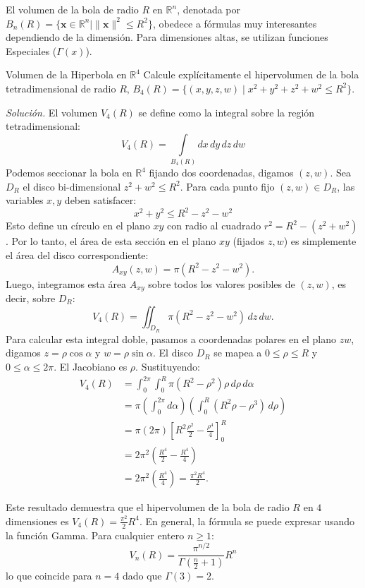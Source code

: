 \documentclass[11pt,a4paper]{article}
\begin{document}
El volumen de la bola de radio $R$ en $\mathbb{R}^n$, denotada por $B_n(R) = \{ \mathbf{x} \in \mathbb{R}^n \mid \|\mathbf{x}\|^2 \leq R^2 \}$, obedece a fórmulas muy interesantes dependiendo de la dimensión. Para dimensiones altas, se utilizan funciones Especiales ($\Gamma(x)$). 

\begin{ejerciciobox}{Volumen de la Hiperbola en $\mathbb{R}^4$}{}
    Calcule explícitamente el hipervolumen de la bola tetradimensional de radio $R$, $B_4(R) = \{ (x,y,z,w) \mid x^2+y^2+z^2+w^2 \leq R^2 \}$.
\end{ejerciciobox}

\textit{Solución.} El volumen $V_4(R)$ se define como la integral sobre la región tetradimensional:
\[
V_4(R) = \int\limits_{B_4(R)} dx \, dy \, dz \, dw
\]
Podemos seccionar la bola en $\mathbb{R}^4$ fijando dos coordenadas, digamos $(z,w)$. Sea $D_R$ el disco bi-dimensional $z^2+w^2 \leq R^2$. Para cada punto fijo $(z,w) \in D_R$, las variables $x, y$ deben satisfacer:
\[
x^2+y^2 \leq R^2 - z^2 - w^2
\]
Esto define un círculo en el plano $xy$ con radio al cuadrado $r^2 = R^2 - (z^2+w^2)$. Por lo tanto, el área de esta sección en el plano $xy$ (fijados $z, w$) es simplemente el área del disco correspondiente:
\[
A_{xy}(z,w) = \pi (R^2 - z^2 - w^2).
\]
Luego, integramos esta área $A_{xy}$ sobre todos los valores posibles de $(z,w)$, es decir, sobre $D_R$:
\[
V_4(R) = \iint_{D_R} \pi (R^2 - z^2 - w^2) \, dz \, dw.
\]
Para calcular esta integral doble, pasamos a coordenadas polares en el plano $zw$, digamos $z = \rho \cos\alpha$ y $w = \rho \sin\alpha$. El disco $D_R$ se mapea a $0 \leq \rho \leq R$ y $0 \leq \alpha \leq 2\pi$. El Jacobiano es $\rho$. Sustituyendo:
\begin{align*}
V_4(R) &= \int_0^{2\pi} \int_0^R \pi (R^2 - \rho^2) \rho \, d\rho \, d\alpha \\
&= \pi \left( \int_0^{2\pi} d\alpha \right) \left( \int_0^R (R^2 \rho - \rho^3) \, d\rho \right) \\
&= \pi (2\pi) \left[ R^2 \frac{\rho^2}{2} - \frac{\rho^4}{4} \right]_0^R \\
&= 2\pi^2 \left( \frac{R^4}{2} - \frac{R^4}{4} \right) \\
&= 2\pi^2 \left( \frac{R^4}{4} \right) = \frac{\pi^2 R^4}{2}.
\end{align*}

Este resultado demuestra que el hipervolumen de la bola de radio $R$ en $4$ dimensiones es $V_4(R) = \frac{\pi^2}{2} R^4$. En general, la fórmula se puede expresar usando la función Gamma. Para cualquier entero $n \geq 1$:
\[
V_n(R) = \frac{\pi^{n/2}}{\Gamma(\frac{n}{2} + 1)} R^n
\]
lo que coincide para $n=4$ dado que $\Gamma(3) = 2$.
\newpage
\end{document}
